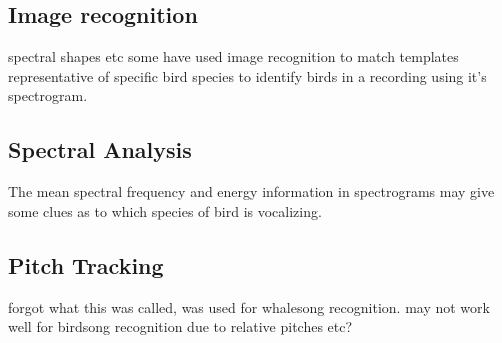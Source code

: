 \subsection{Image recognition}
spectral shapes etc
some have used image recognition to match templates representative of specific
bird species to identify birds in a recording using it's spectrogram.

\subsection{Spectral Analysis}
The mean spectral frequency and energy information in spectrograms may give some
clues as to which species of bird is vocalizing.

\subsection{Pitch Tracking}
forgot what this was called, was used for whalesong recognition.
may not work well for birdsong recognition due to relative pitches etc?

